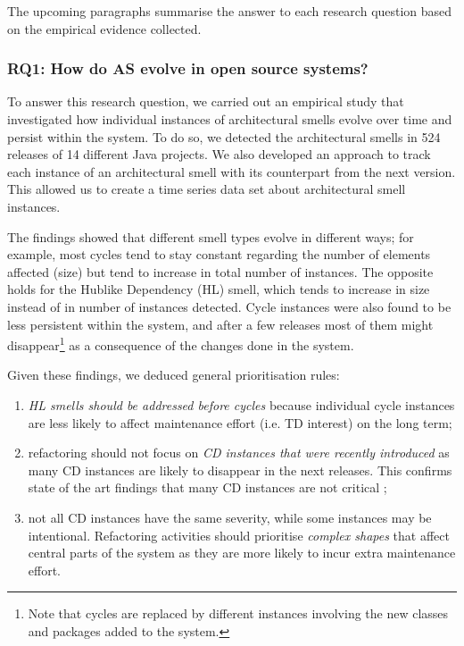 The upcoming paragraphs summarise the answer to each research question based on the empirical evidence collected.

\subsubsection*{RQ1: How do AS evolve in open source systems?}
To answer this research question, we carried out an empirical study that investigated how individual instances of architectural smells evolve over time and persist within the system.
To do so, we detected the architectural smells in 524 releases of 14 different Java projects. 
We also developed an approach to track each instance of an architectural smell with its counterpart from the next version.
This allowed us to create a time series data set about architectural smell instances.

The findings showed that different smell types evolve in different ways; for example, most cycles tend to stay constant regarding the number of elements affected (size) but tend to increase in total number of instances.
The opposite holds for the Hublike Dependency (HL) smell, which tends to increase in size instead of in number of instances detected.
Cycle instances were also found to be less persistent within the system, and after a few releases most of them might disappear\footnote{Note that cycles are replaced by different instances involving the new classes and packages added to the system.} as a consequence of the changes done in the system.

Given these findings, we deduced general prioritisation rules:
\begin{enumerate}
\item \emph{HL smells should be addressed before cycles} because individual cycle instances are less likely to affect maintenance effort (i.e. TD interest) on the long term;
\item refactoring should not focus on \emph{CD instances that were recently introduced} as many CD instances are likely to disappear in the next releases. This confirms state of the art findings that many CD instances are not critical \cite{AlMutawa2014};
\item not all CD instances have the same severity, while some instances may be intentional. Refactoring activities should prioritise \emph{complex shapes} that affect central parts of the system as they are more likely to incur extra maintenance effort.
\end{enumerate}

